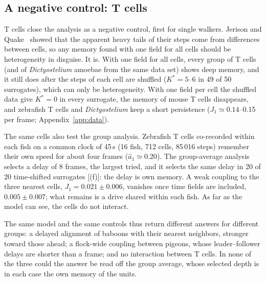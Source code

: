 \subsection{A negative control: T cells}\label{sec:tcells}

T cells close the analysis as a negative control, first for single walkers. Jerison and Quake~\cite{Jerison2020} showed that the apparent heavy tails of their steps come from differences between cells, so any memory found with one field for all cells should be heterogeneity in disguise. It is. With one field for all cells, every group of T cells (and of \emph{Dictyostelium} amoebae from the same data set) shows deep memory, and it still does after the steps of each cell are shuffled ($K^*=5$--6 in 49 of 50 surrogates), which can only be heterogeneity. With one field per cell the shuffled data give $K^*=0$ in every surrogate, the memory of mouse T cells disappears, and zebrafish T cells and \emph{Dictyostelium} keep a short persistence ($J_1\simeq0.14$--0.15 per frame; Appendix~\ref{app:data}).

The same cells also test the group analysis. Zebrafish T cells co-recorded within each fish on a common clock of 45\,s (16 fish, 712 cells, 85\,016 steps) remember their own speed for about four frames ($\hat a_1\simeq0.20$). The group-average analysis selects a delay of 8 frames, the largest tried, and it selects the same delay in 20 of 20 time-shifted surrogates [(f)]: the delay is own memory. A weak coupling to the three nearest cells, $J_1=0.021\pm0.006$, vanishes once time fields are included, $0.005\pm0.007$; what remains is a drive shared within each fish. As far as the model can see, the cells do not interact.

The same model and the same controls thus return different answers for different groups: a delayed alignment of baboons with their nearest neighbors, stronger toward those ahead; a flock-wide coupling between pigeons, whose leader--follower delays are shorter than a frame; and no interaction between T cells. In none of the three could the answer be read off the group average, whose selected depth is in each case the own memory of the units.
